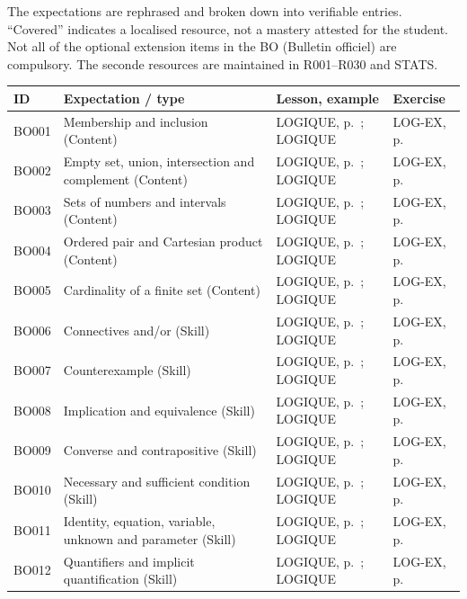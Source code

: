 \label{MATRICE}
The expectations are rephrased and broken down into verifiable entries. ``Covered'' indicates a localised resource, not a mastery attested for the student. Not all of the optional extension items in the BO (Bulletin officiel) are compulsory. The seconde resources are maintained in R001--R030 and STATS.
\small\begin{longtable}{p{.1\linewidth}p{.43\linewidth}p{.19\linewidth}p{.16\linewidth}}\toprule ID & Expectation / type & Lesson, example & Exercise \\\midrule\endhead
BO001 & Membership and inclusion (Content) & LOGIQUE, p.\,\pageref{LOGIQUE} ; LOGIQUE & LOG-EX, p.\,\pageref{LOG-EX} \\
BO002 & Empty set, union, intersection and complement (Content) & LOGIQUE, p.\,\pageref{LOGIQUE} ; LOGIQUE & LOG-EX, p.\,\pageref{LOG-EX} \\
BO003 & Sets of numbers and intervals (Content) & LOGIQUE, p.\,\pageref{LOGIQUE} ; LOGIQUE & LOG-EX, p.\,\pageref{LOG-EX} \\
BO004 & Ordered pair and Cartesian product (Content) & LOGIQUE, p.\,\pageref{LOGIQUE} ; LOGIQUE & LOG-EX, p.\,\pageref{LOG-EX} \\
BO005 & Cardinality of a finite set (Content) & LOGIQUE, p.\,\pageref{LOGIQUE} ; LOGIQUE & LOG-EX, p.\,\pageref{LOG-EX} \\
BO006 & Connectives and/or (Skill) & LOGIQUE, p.\,\pageref{LOGIQUE} ; LOGIQUE & LOG-EX, p.\,\pageref{LOG-EX} \\
BO007 & Counterexample (Skill) & LOGIQUE, p.\,\pageref{LOGIQUE} ; LOGIQUE & LOG-EX, p.\,\pageref{LOG-EX} \\
BO008 & Implication and equivalence (Skill) & LOGIQUE, p.\,\pageref{LOGIQUE} ; LOGIQUE & LOG-EX, p.\,\pageref{LOG-EX} \\
BO009 & Converse and contrapositive (Skill) & LOGIQUE, p.\,\pageref{LOGIQUE} ; LOGIQUE & LOG-EX, p.\,\pageref{LOG-EX} \\
BO010 & Necessary and sufficient condition (Skill) & LOGIQUE, p.\,\pageref{LOGIQUE} ; LOGIQUE & LOG-EX, p.\,\pageref{LOG-EX} \\
BO011 & Identity, equation, variable, unknown and parameter (Skill) & LOGIQUE, p.\,\pageref{LOGIQUE} ; LOGIQUE & LOG-EX, p.\,\pageref{LOG-EX} \\
BO012 & Quantifiers and implicit quantification (Skill) & LOGIQUE, p.\,\pageref{LOGIQUE} ; LOGIQUE & LOG-EX, p.\,\pageref{LOG-EX} \\

\end{longtable}
